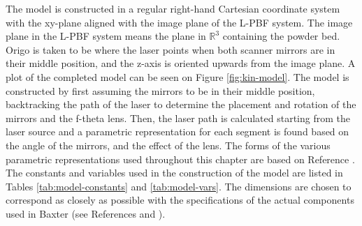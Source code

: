 The model is constructed in a regular right-hand Cartesian coordinate system with the xy-plane aligned with the image plane of the L-PBF system. The image plane in the L-PBF system means the plane in $\mathbb{R}^3$ containing the powder bed. Origo is taken to be where the laser points when both scanner mirrors are in their middle position, and the z-axis is oriented upwards from the image plane. A plot of the completed model can be seen on Figure \ref{fig:kin-model}. The model is constructed by first assuming the mirrors to be in their middle position, backtracking the path of the laser to determine the placement and rotation of the mirrors and the f-theta lens. Then, the laser path is calculated starting from the laser source and a parametric representation for each segment is found based on the angle of the mirrors, and the effect of the lens. The forms of the various parametric representations used throughout this chapter are based on Reference \cite{mat1-efterår}. The constants and variables used in the construction of the model are listed in Tables \ref{tab:model-constants} and \ref{tab:model-vars}. The dimensions are chosen to correspond as closely as possible with the specifications of the actual components used in Baxter (see References \cite{scanner-spec} and \cite{f-theta-lens-spec}).

